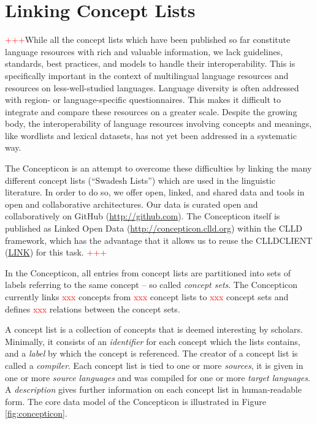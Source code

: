 \documentclass[10pt, a4paper]{article}
\newcommand{\conceptnumber}{\textcolor{red}{xxx} }
\newcommand{\listnumber}{\textcolor{red}{xxx} }
\newcommand{\setnumber}{\textcolor{red}{xxx} }
\newcommand{\relationnumber}{\textcolor{red}{xxx} }
\begin{document}
\section{Linking Concept Lists}
\textcolor{red}{+++}While all the concept lists which have been published so far constitute language
resources with rich and valuable information, we lack guidelines, standards, best practices, and
models to handle their interoperability. This is specifically important in the context of
multilingual language resources and resources on less-well-studied languages. 
Language diversity is often addressed with region- or
language-specific questionnaires. This makes it difficult to integrate and compare these resources
on a greater scale. Despite the growing body, the interoperability of language resources involving
concepts and meanings, like wordlists and lexical datasets, has not yet been addressed in a
systematic way.  
 
The Concepticon is an attempt to overcome these difficulties by linking 
the many different concept lists (``Swadesh Lists'') which are
used in the linguistic literature. 
In order to do so, we offer open, linked, and shared data and tools in open and collaborative
architectures. Our data is curated open and collaboratively on GitHub (\url{http://github.com}). The
Concepticon itself is published as Linked Open Data (\url{http://concepticon.clld.org}) within the
CLLD framework, which has the advantage that it allows us to reuse the CLLDCLIENT (\url{LINK}) 
for this task. \textcolor{red}{+++}


In the Concepticon, all entries from concept lists are partitioned into sets
of labels referring to the same concept -- so called \emph{concept sets}. The Concepticon currently links
\conceptnumber concepts from \listnumber concept lists to \setnumber concept sets and defines
\relationnumber relations between the concept sets.
 
A concept list is a collection of concepts that is deemed interesting by scholars. Minimally, it
consists of an \emph{identifier} for each concept which the lists contains, and a \emph{label} by
which the concept is referenced. The creator of a concept list is called a \emph{compiler}. Each
concept list is tied to one or more \emph{sources}, it is given in one or more \emph{source
languages} and was compiled for one or more \emph{target languages}. A \emph{description} gives
further information on each concept list in human-readable form. The core
data model of the Concepticon is illustrated in Figure \ref{fig:concepticon}.
 
\end{document}
